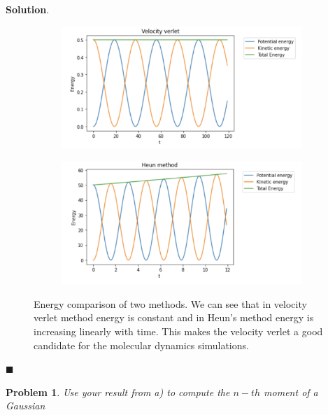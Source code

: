 \documentclass[12pt]{article}
\renewcommand{\=}[1]{\stackrel{#1}{=}} %
\newtheorem{p}{Problem}[section]
\theoremstyle{definition}
\newenvironment{s}{%
        \begin{trivlist} \item \textbf{Solution}. }{%
            \hspace*{\fill} $\blacksquare$\end{trivlist}}%
\begin{document}
\begin{s}
\begin{figure}
\caption{}
\label{fig:test}
\end{figure}
%
%
\begin{figure}
\centering
\begin{subfigure}{.5\textwidth}
  \centering
  \includegraphics[width=.9\linewidth]{pic7.png}
  \caption{}
  \label{fig:sub1}
\end{subfigure}%
\begin{subfigure}{.5\textwidth}
  \centering
  \includegraphics[width=.9\linewidth]{pic8.png}
  \caption{}
  \label{fig:sub2}
\end{subfigure}
\caption{Energy comparison of two methods. We can see that in velocity verlet method energy is constant and in Heun's method energy is increasing linearly with time. This makes the velocity verlet a good candidate for the molecular dynamics simulations.}
\label{fig:test}
\end{figure}
%

\end{s}
%
\begin{p}  Use your result from a) to compute the $n-th$ moment of a Gaussian
%
\begin{equation}
  
\end{equation}
%
%

%
\end{p}
	
\end{document}
